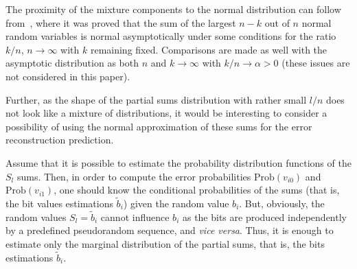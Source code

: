 \begin{multicols}{2}
The proximity of the mixture components to the normal distribution can follow from~\cite{5-fr}, 
where it was proved that the sum of the largest $n-k$ out of $n$ normal random variables 
is normal asymptotically under some conditions for the ratio $k/n$, $n \rightarrow \infty$  
with $k$ remaining fixed. Comparisons are made as well with the asymptotic distribution 
as both $n$ and $k \rightarrow \infty$   with $ k/n  \rightarrow \alpha> 0 $
(these issues are not considered in this paper).

Further, as the shape of the partial sums distribution with rather small $l/n$ does not 
look like a mixture of distributions, it would be interesting to consider a possibility 
of using the normal approximation of these sums  for the error reconstruction prediction.

       Assume that it is possible to estimate the probability distribution functions 
       of the $S_l$ sums. Then, in order to compute the error probabilities  
       $\mathrm{Prob}\left(v_{i0}\right)$ and
       $\mathrm{Prob}\left(v_{i1}\right)$, one should know the conditional probabilities of the sums 
       (that is, the  bit values estimations $\tilde b_i$) given the random value $b_i$. But, obviously, the 
       random values $S_l= \tilde b_i$ cannot influence $b_i $ as the bits are produced 
       independently by a predefined pseudorandom sequence, and \textit{vice versa}.
       Thus, it is enough to estimate only the marginal distribution of the 
       partial sums, that is, the bits estimations $\tilde b_i$.
       
       \begin{figure*} %
       \vspace*{1pt}
       \begin{minipage}[t]{78mm}
 \begin{center}
 \mbox{%
 \epsfxsize=75.453mm
 }
 \end{center}
 \vspace*{-9pt}
\end{minipage}
\hfill
\begin{minipage}[t]{80mm}
 \begin{center}
 \mbox{%
 \epsfxsize=78.498mm
 }
 \end{center}
 \vspace*{-9pt}
\end{minipage}
\vspace*{6pt}
\end{figure*}


\end{multicols}

